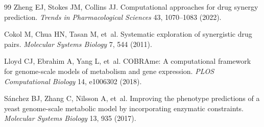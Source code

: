 \documentclass[12pt,a4paper]{article}
\begin{document}
\begin{thebibliography}{99}
Zheng EJ, Stokes JM, Collins JJ.
\newblock Computational approaches for drug synergy prediction.
\newblock \textit{Trends in Pharmacological Sciences} 43, 1070--1083 (2022).

Cokol M, Chua HN, Tasan M, et~al.
\newblock Systematic exploration of synergistic drug pairs.
\newblock \textit{Molecular Systems Biology} 7, 544 (2011).

Lloyd CJ, Ebrahim A, Yang L, et~al.
\newblock COBRAme: A computational framework for genome-scale models of metabolism and gene expression.
\newblock \textit{PLOS Computational Biology} 14, e1006302 (2018).

S\'anchez BJ, Zhang C, Nilsson A, et~al.
\newblock Improving the phenotype predictions of a yeast genome-scale metabolic model by incorporating enzymatic constraints.
\newblock \textit{Molecular Systems Biology} 13, 935 (2017).

\end{thebibliography}
\end{document}
